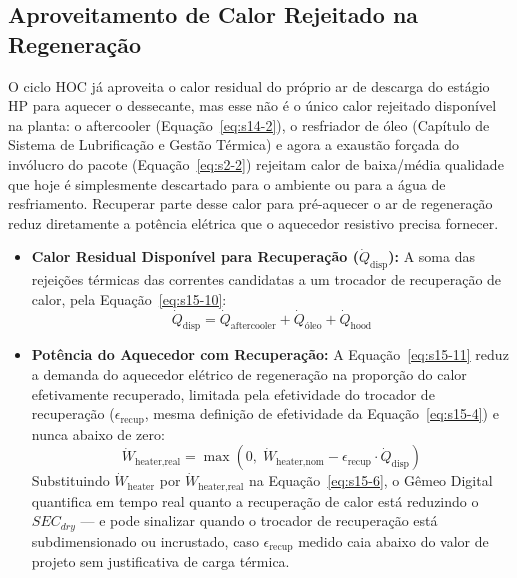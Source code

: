\documentclass[12pt,a4paper]{article}
\numberwithin{equation}{section}
\numberwithin{table}{section}
\numberwithin{figure}{section}
\begin{document}
		\subsection{\textbf{Aproveitamento de Calor Rejeitado na Regeneração}}
		O ciclo HOC já aproveita o calor residual do próprio ar de descarga do estágio HP para aquecer o dessecante, mas esse não é o único calor rejeitado disponível na planta: o aftercooler (Equação~\eqref{eq:s14-2}), o resfriador de óleo (Capítulo de Sistema de Lubrificação e Gestão Térmica) e agora a exaustão forçada do invólucro do pacote (Equação~\eqref{eq:s2-2}) rejeitam calor de baixa/média qualidade que hoje é simplesmente descartado para o ambiente ou para a água de resfriamento. Recuperar parte desse calor para pré-aquecer o ar de regeneração reduz diretamente a potência elétrica que o aquecedor resistivo precisa fornecer.
		\begin{itemize}
			\item \textbf{Calor Residual Disponível para Recuperação ($\dot{Q}_{\text{disp}}$):} A soma das rejeições térmicas das correntes candidatas a um trocador de recuperação de calor, pela Equação~\eqref{eq:s15-10}:
			\begin{equation}\label{eq:s15-10}
\dot{Q}_{\text{disp}} = \dot{Q}_{\text{aftercooler}} + \dot{Q}_{\text{óleo}} + \dot{Q}_{\text{hood}}
\end{equation}
			\item \textbf{Potência do Aquecedor com Recuperação:} A Equação~\eqref{eq:s15-11} reduz a demanda do aquecedor elétrico de regeneração na proporção do calor efetivamente recuperado, limitada pela efetividade do trocador de recuperação ($\epsilon_{\text{recup}}$, mesma definição de efetividade da Equação~\eqref{eq:s15-4}) e nunca abaixo de zero:
			\begin{equation}\label{eq:s15-11}
\dot{W}_{\text{heater,real}} = \max\left(0,\; \dot{W}_{\text{heater,nom}} - \epsilon_{\text{recup}} \cdot \dot{Q}_{\text{disp}}\right)
\end{equation}
			Substituindo $\dot{W}_{\text{heater}}$ por $\dot{W}_{\text{heater,real}}$ na Equação~\eqref{eq:s15-6}, o Gêmeo Digital quantifica em tempo real quanto a recuperação de calor está reduzindo o $SEC_{dry}$ — e pode sinalizar quando o trocador de recuperação está subdimensionado ou incrustado, caso $\epsilon_{\text{recup}}$ medido caia abaixo do valor de projeto sem justificativa de carga térmica.
		\end{itemize}
\end{document}
